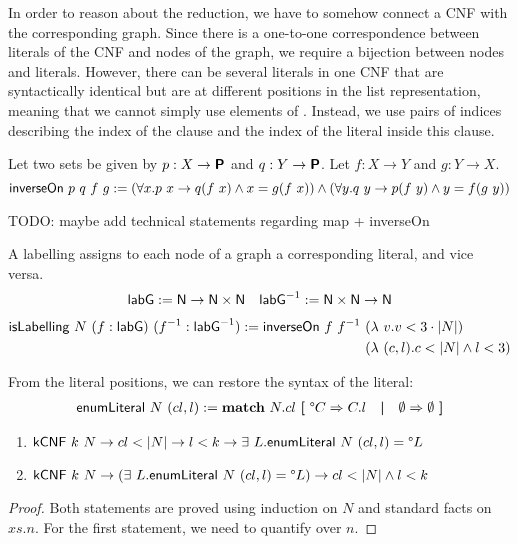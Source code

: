 \documentclass[a4paper,UKenglish,cleveref, autoref]{lipics-v2019}
\begin{document}
In order to reason about the reduction, we have to somehow connect a CNF with the corresponding graph. Since there is a one-to-one correspondence between literals of the CNF and nodes of the graph, we require a bijection between nodes and literals. However, there can be several literals in one CNF that are syntactically identical but are at different positions in the list representation, meaning that we cannot simply use elements of \literal. Instead, we use pairs of indices describing the index of the clause and the index of the literal inside this clause.

\begin{definition}
  Let two sets be given by $p : X \rightarrow \textsf{\bfseries P}$ and $q : Y \rightarrow \textsf{\bfseries P}$. Let $f : X \rightarrow Y$ and $g : Y \rightarrow X$.
  \[\normalfont\textsf{inverseOn}~p~q~f~g := (\forall x. p~x \rightarrow q(f~x) \land x = g(f~x)) \land (\forall y. q~y \rightarrow p(f~y) \land y = f(g~y)) \]
\end{definition}

TODO: maybe add technical statements regarding map + inverseOn

\begin{definition}
  A labelling assigns to each node of a graph a corresponding literal, and vice versa.
  \begin{align*}
  \normalfont\textsf{labG} := \mathsf{N} \rightarrow \mathsf{N} \times \mathsf{N} && \normalfont\textsf{labG}^{-1} := \mathsf{N} \times \mathsf{N} \rightarrow \mathsf{N}
  \end{align*}
  \begin{align*}
  \normalfont\textsf{isLabelling}~N~(f : \normalfont\textsf{labG})~(f^{-1} : \normalfont\textsf{labG}^{-1}) := \normalfont\textsf{inverseOn}~f~f^{-1}~ &(\lambda~v. v < 3 \cdot |N|)\\
  ~&(\lambda~(c, l). c < |N| \land l < 3) 
\end{align*}
\end{definition}

From the literal positions, we can restore the syntax of the literal:
\begin{align*}
  \textsf{enumLiteral}~N~(cl, l) := \textbf{match}~ N.cl ~\textbf{[}~ \degree C \Rightarrow C.l \quad\textbf{|}\quad \emptyset \Rightarrow \emptyset ~\textbf{]} 
\end{align*}
\begin{proposition}\label{prop:enumLiteralcorrect}\leavevmode
  \begin{enumerate}
    \item $\normalfont\textsf{kCNF}~k~N \rightarrow cl < |N| \rightarrow l < k \rightarrow \exists~L. \normalfont\textsf{enumLiteral}~N~(cl, l) = \degree L $
    \item $\normalfont\textsf{kCNF}~k~N \rightarrow (\exists~L. \normalfont\textsf{enumLiteral}~N~(cl, l) = \degree L) \rightarrow cl < |N| \land l < k$
  \end{enumerate}
\end{proposition}
\begin{proof}
  Both statements are proved using induction on $N$ and standard facts on $xs.n$. For the first statement, we need to quantify over $n$.
\end{proof}
\end{document}
